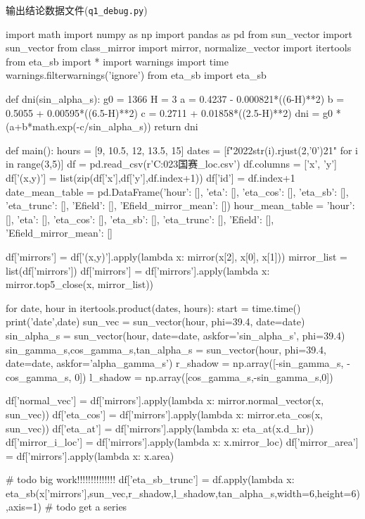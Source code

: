 \documentclass{article}
\numberwithin{equation}{subsection}
\begin{document}
输出结论数据文件(\verb|q1_debug.py|)
\begin{python}
import math
import numpy as np
import pandas as pd
from sun_vector import sun_vector
from class_mirror import mirror, normalize_vector
import itertools
from eta_sb import *
import warnings
import time
warnings.filterwarnings('ignore')
from eta_sb import eta_sb


def dni(sin_alpha_s):
    g0 = 1366
    H = 3
    a = 0.4237 - 0.000821*((6-H)**2)
    b = 0.5055 + 0.00595*((6.5-H)**2)
    c = 0.2711 + 0.01858*((2.5-H)**2)
    dni = g0 * (a+b*math.exp(-c/sin_alpha_s))
    return dni


def main():
    hours = [9, 10.5, 12, 13.5, 15]
    dates = [f"2022{str(i).rjust(2,'0')}21" for i in range(3,5)]
    df = pd.read_csv(r'C:\Users\Administrator\Desktop\2023国赛\mirror_loc.csv')
    df.columns = ['x', 'y']
    df['(x,y)'] = list(zip(df['x'],df['y'],df.index+1))
    df['id'] = df.index+1
    date_mean_table = pd.DataFrame({'hour': [], 'eta': [], 'eta_cos': [], 'eta_sb': [], 'eta_trunc': [], 'Efield': [], 'Efield_mirror_mean': []})
    hour_mean_table = {'hour': [], 'eta': [], 'eta_cos': [], 'eta_sb': [], 'eta_trunc': [], 'Efield': [],
                       'Efield_mirror_mean': []}

    df['mirrors'] = df['(x,y)'].apply(lambda x: mirror(x[2], x[0], x[1]))
    mirror_list = list(df['mirrors'])
    df['mirrors'] = df['mirrors'].apply(lambda x: mirror.top5_close(x, mirror_list))

    for date, hour in itertools.product(dates, hours):
        start = time.time()
        print('date',date)
        sun_vec = sun_vector(hour, phi=39.4, date=date)
        sin_alpha_s = sun_vector(hour, date=date, askfor='sin_alpha_s', phi=39.4)
        sin_gamma_s,cos_gamma_s,tan_alpha_s = sun_vector(hour, phi=39.4, date=date, askfor='alpha_gamma_s')
        r_shadow = np.array([-sin_gamma_s, -cos_gamma_s, 0])
        l_shadow = np.array([cos_gamma_s,-sin_gamma_s,0])

        df['normal_vec'] = df['mirrors'].apply(lambda x: mirror.normal_vector(x, sun_vec))
        df['eta_cos'] = df['mirrors'].apply(lambda x: mirror.eta_cos(x, sun_vec))
        df['eta_at'] = df['mirrors'].apply(lambda x: eta_at(x.d_hr))
        df['mirror_i_loc'] = df['mirrors'].apply(lambda x: x.mirror_loc)
        df['mirror_area'] = df['mirrors'].apply(lambda x: x.area)

        # todo big work!!!!!!!!!!!!!!
        df['eta_sb_trunc'] = df.apply(lambda x: eta_sb(x['mirrors'],sun_vec,r_shadow,l_shadow,tan_alpha_s,width=6,height=6),axis=1)            # todo get a series


\end{python}
\end{document}
